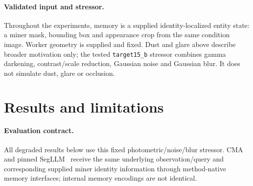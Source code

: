 \documentclass[10pt,twocolumn]{article}
\begin{document}



\paragraph{Validated input and stressor.}
Throughout the experiments, memory is a supplied identity-localized entity
state: a miner mask, bounding box and appearance crop from the same condition
image. Worker geometry is supplied and fixed. Dust and glare above describe
broader motivation only; the tested \texttt{target15\_b} stressor combines
gamma darkening, contrast/scale reduction, Gaussian noise and Gaussian blur.
It does not simulate dust, glare or occlusion.


\section{Results and limitations}
\paragraph{Evaluation contract.}
All degraded results below use this fixed photometric/noise/blur stressor.
CMA and pinned SegLLM~\cite{wang2025segllm} receive the same underlying observation/query and
corresponding supplied miner identity information through method-native
memory interfaces; internal memory encodings are not identical.





\clearpage

\end{document}
